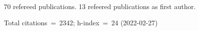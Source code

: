 70 refereed publications. 13 refeered publications as first author.

Total citations~=~2342; h-index~=~24 (2022-02-27)